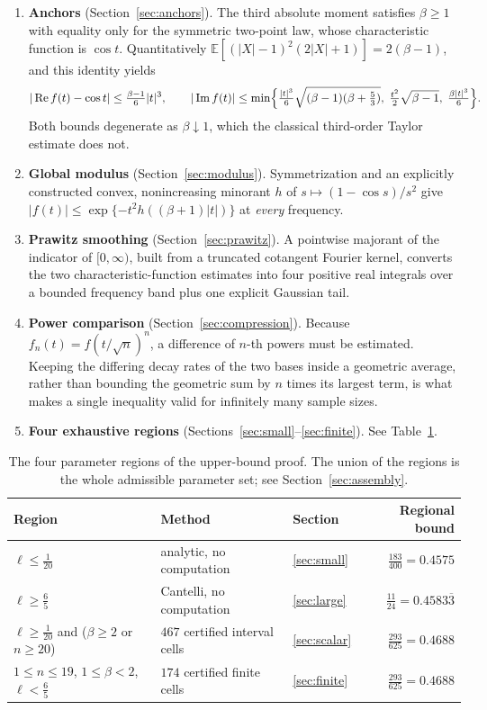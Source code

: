 \documentclass[10pt,a4paper]{article}
\theoremstyle{plain}
\theoremstyle{definition}
\newcommand{\E}{\mathbb{E}}
\DeclareMathOperator{\Rea}{Re}
\DeclareMathOperator{\Ima}{Im}
\begin{document}
\begin{enumerate}[leftmargin=2.2em]
\item \textbf{Anchors} (Section~\ref{sec:anchors}). The third absolute moment
  satisfies $\beta\ge1$ with equality only for the symmetric two-point law,
  whose characteristic function is $\cos t$. Quantitatively
  $\E[(|X|-1)^2(2|X|+1)]=2(\beta-1)$, and this identity yields
  \[
    |\Rea f(t)-\cos t| \le \tfrac{\beta-1}{6}|t|^3,
    \qquad
    |\Ima f(t)| \le \min\Bigl\{
      \tfrac{|t|^3}{6}\sqrt{(\beta-1)(\beta+\tfrac53)},\;
      \tfrac{t^2}{2}\sqrt{\beta-1},\;
      \tfrac{\beta|t|^3}{6}\Bigr\}.
  \]
  Both bounds degenerate as $\beta\downarrow1$, which the classical
  third-order Taylor estimate does not.
\item \textbf{Global modulus} (Section~\ref{sec:modulus}). Symmetrization and
  an explicitly constructed convex, nonincreasing minorant $h$ of
  $s\mapsto(1-\cos s)/s^2$ give
  $|f(t)|\le\exp\{-t^2h((\beta+1)|t|)\}$ at \emph{every} frequency.
\item \textbf{Prawitz smoothing} (Section~\ref{sec:prawitz}). A pointwise
  majorant of the indicator of $[0,\infty)$, built from a truncated cotangent
  Fourier kernel, converts the two characteristic-function estimates into four
  positive real integrals over a bounded frequency band plus one explicit
  Gaussian tail.
\item \textbf{Power comparison} (Section~\ref{sec:compression}). Because
  $f_n(t)=f(t/\sqrt n)^n$, a difference of $n$-th powers must be estimated.
  Keeping the differing decay rates of the two bases inside a geometric
  average, rather than bounding the geometric sum by $n$ times its largest
  term, is what makes a single inequality valid for infinitely many sample
  sizes.
\item \textbf{Four exhaustive regions} (Sections~\ref{sec:small}--\ref{sec:finite}).
  See Table~\ref{tab:regions}.
\end{enumerate}

\begin{table}[ht]
\centering
\begin{tabular}{@{}lll r@{}}
\toprule
Region & Method & Section & Regional bound \\
\midrule
$\ell\le\frac1{20}$
  & analytic, no computation & \ref{sec:small} & $\frac{183}{400}=0.4575$ \\
$\ell\ge\frac65$
  & Cantelli, no computation & \ref{sec:large} & $\frac{11}{24}=0.4583\overline{3}$ \\
$\ell\ge\frac1{20}$ and ($\beta\ge2$ or $n\ge20$)
  & $467$ certified interval cells & \ref{sec:scalar} & $\frac{293}{625}=0.4688$ \\
$1\le n\le19$, $1\le\beta<2$, $\ell<\frac65$
  & $174$ certified finite cells & \ref{sec:finite} & $\frac{293}{625}=0.4688$ \\
\bottomrule
\end{tabular}
\caption{The four parameter regions of the upper-bound proof. The union of the
regions is the whole admissible parameter set; see
Section~\ref{sec:assembly}.}
\label{tab:regions}
\end{table}
\end{document}
